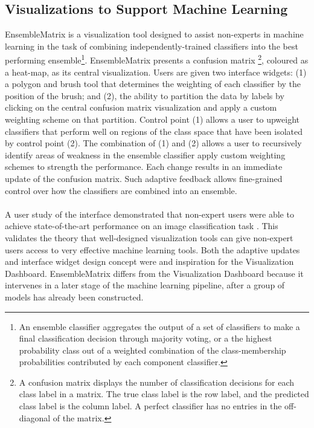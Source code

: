 \documentclass{sigchi}
\begin{document}
\subsection{Visualizations to Support Machine Learning}
%
EnsembleMatrix \cite{talbot2009ensemblematrix} is a visualization tool designed to assist non-experts in machine learning in the task of combining independently-trained classifiers into the best performing ensemble\footnote{An ensemble classifier aggregates the output of a set of classifiers to make a final classification decision through majority voting, or a the highest probability class out of a weighted combination of the class-membership probabilities contributed by each component classifier.}. %
%
EnsembleMatrix presents a confusion matrix \footnote{A confusion matrix displays the number of classification decisions for each class label in a matrix. The true class label is the row label, and the predicted class label is the column label. A perfect classifier has no entries in the off-diagonal of the matrix.}, coloured as a heat-map, as its central visualization. %
%
Users are given two interface widgets: (1) a polygon and brush tool that determines the weighting of each classifier by the position of the brush; and (2), the ability to partition the data by labels by clicking on the central confusion matrix visualization and apply a custom weighting scheme on that partition. %
%
Control point (1) allows a user to upweight classifiers that perform well on regions of the class space that have been isolated by control point (2). %
%
The combination of (1) and (2) allows a user to recursively identify areas of weakness in the ensemble classifier apply custom weighting schemes to strength the performance. %
%
Each change results in an immediate update of the confusion matrix. %
%
Such adaptive feedback allows fine-grained control over how the classifiers are combined into an ensemble. %
\\\\
A user study of the interface demonstrated that non-expert users were able to achieve state-of-the-art performance on an image classification task \cite{talbot2009ensemblematrix}. %
%
This validates the theory that well-designed visualization tools can give non-expert users access to very effective machine learning tools. %
Both the adaptive updates and interface widget design concept were and inspiration for the Visualization Dashboard. %
%
EnsembleMatrix differs from the Visualization Dashboard because it intervenes in a later stage of the machine learning pipeline, after a group of models has already been constructed. %
\end{document}
